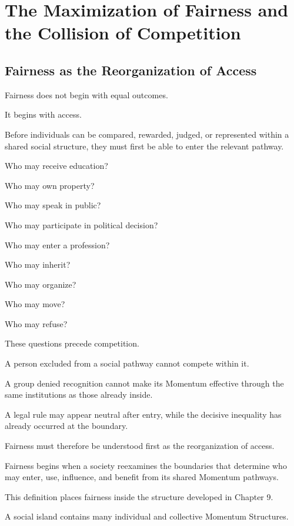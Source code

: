 

\section{The Maximization of Fairness and the Collision of Competition}

\subsection*{\textbf{Fairness as the Reorganization of Access}}

Fairness does not begin with equal outcomes.

It begins with access.

Before individuals can be compared, rewarded, judged, or represented within a shared social structure, they must first be able to enter the relevant pathway.

Who may receive education?

Who may own property?

Who may speak in public?

Who may participate in political decision?

Who may enter a profession?

Who may inherit?

Who may organize?

Who may move?

Who may refuse?

These questions precede competition.

A person excluded from a social pathway cannot compete within it.

A group denied recognition cannot make its Momentum effective through the same institutions as those already inside.

A legal rule may appear neutral after entry, while the decisive inequality has already occurred at the boundary.

Fairness must therefore be understood first as the reorganization of access.

Fairness begins when a society reexamines the boundaries that determine who may enter, use, influence, and benefit from its shared Momentum pathways.

This definition places fairness inside the structure developed in Chapter 9.

A social island contains many individual and collective Momentum Structures.

